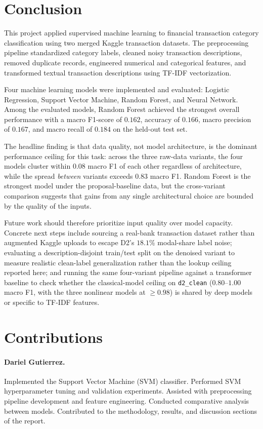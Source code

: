 \documentclass[11pt]{article}
\begin{document}
\FloatBarrier
\section{Conclusion}

This project applied supervised machine learning to financial transaction
category classification using two merged Kaggle transaction datasets. The preprocessing pipeline standardized category
labels, cleaned noisy transaction descriptions, removed duplicate records,
engineered numerical and categorical features, and transformed textual
transaction descriptions using TF-IDF vectorization.

Four machine learning models were implemented and evaluated: Logistic
Regression, Support Vector Machine, Random Forest, and Neural Network.
Among the evaluated models, Random Forest achieved the strongest overall
performance with a macro F1-score of $0.162$, accuracy of $0.166$, macro
precision of $0.167$, and macro recall of $0.184$ on the held-out test set.

The headline finding is that data quality, not model architecture,
is the dominant performance ceiling for this task: across the three
raw-data variants, the four models cluster within $0.08$ macro F1 of
each other regardless of architecture, while the spread \emph{between}
variants exceeds $0.83$ macro F1. Random Forest is the strongest model
under the proposal-baseline data, but the cross-variant comparison
suggests that gains from any single architectural choice are bounded
by the quality of the inputs.

Future work should therefore prioritize input quality over model
capacity. Concrete next steps include sourcing a real-bank transaction
dataset rather than augmented Kaggle uploads to escape D2's $18.1\%$
modal-share label noise; evaluating a description-disjoint train/test
split on the denoised variant to measure realistic clean-label
generalization rather than the lookup ceiling reported here; and
running the same four-variant pipeline against a transformer baseline
to check whether the classical-model ceiling on \texttt{d2\_clean}
($0.80$--$1.00$ macro F1, with the three nonlinear models at
$\geq 0.98$) is shared by deep models or specific to TF-IDF features.

\section*{Contributions}

\paragraph{Dariel Gutierrez.}
Implemented the Support Vector Machine (SVM) classifier. Performed SVM
hyperparameter tuning and validation experiments. Assisted with preprocessing
pipeline development and feature engineering. Conducted comparative analysis
between models. Contributed to the methodology, results, and discussion
sections of the report.
\end{document}

